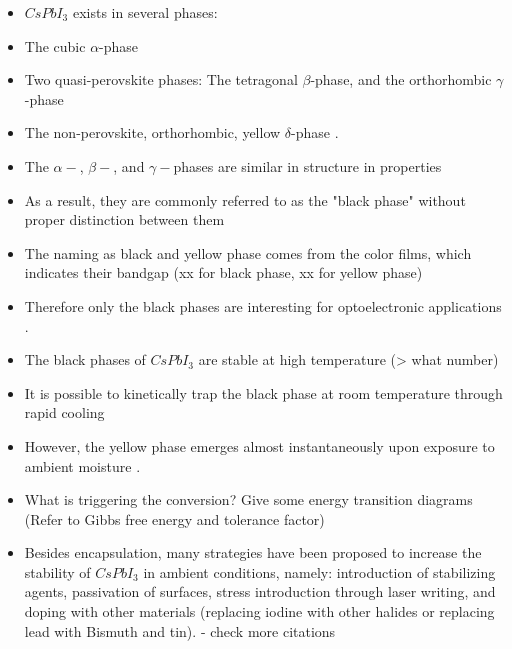 \begin{itemize}
    \item $CsPbI_3$ exists in several phases:
    \item The cubic $\alpha$-phase
    \item Two quasi-perovskite phases: The tetragonal $\beta$-phase, and the orthorhombic $\gamma$-phase
    \item The non-perovskite, orthorhombic, yellow $\delta$-phase \cite{Steele2019ThermalFilms,Mali2021ImplementingCells}. 
       
    
    \item The $\alpha-$, $\beta-$, and $\gamma-$phases are similar in structure in properties
    \item As a result, they are commonly referred to as the "black phase" without proper distinction between them \cite{Steele2019ThermalFilms, Yan2020DeterminationFilms, Sutton2018CubicExperiment}

    \item The naming as black and yellow phase comes from the color films, which indicates their bandgap (xx for black phase, xx for yellow phase)

    \item Therefore only the black phases are interesting for optoelectronic applications \cite{Burwig2018CrystalFilms, Steele2022AnFilms}.

    \item The black phases of $CsPbI_3$ are stable at high temperature (> what number)

    \item It is possible to kinetically trap the black phase at room temperature through rapid cooling

    \item However, the yellow phase emerges almost instantaneously upon exposure to ambient moisture \cite{Steele2019ThermalFilms}.

    \item What is triggering the conversion? Give some energy transition diagrams (Refer to Gibbs free energy and tolerance factor)

    \item Besides encapsulation, many strategies have been proposed to increase the stability of $CsPbI_3$ in ambient conditions, namely: introduction of stabilizing agents, passivation of surfaces, stress introduction through laser writing, and doping with other materials (replacing iodine with other halides or replacing lead with Bismuth and tin). \cite{Li2018SurfaceCells, Li2020ApproachesCells, Steele2022AnFilms, MinSim2018PhaseApplications} - check more citations  
    
\end{itemize}


